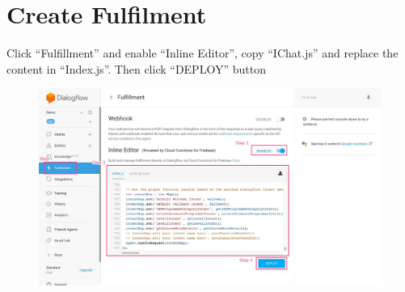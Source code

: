 \section{Create Fulfilment} %
\label{sec:create_fulfilment}
	Click “Fulfillment” and enable “Inline Editor”, copy “IChat.js” and replace the content in “Index.js”. Then click “DEPLOY” button

	\begin{figure}[H]
		\centering
		\includegraphics[width=\linewidth, frame]{img/manual_15.jpg}
	\end{figure}

